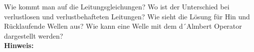 \begin{question}[section=5,subsection=53,name={Leitungsgleichungen},difficulty=7,type=mdl,tags={}]
	Wie kommt man auf die Leitungsgleichungen? Wo ist der Unterschied bei verlustlosen und verlustbehafteten Leitungen? Wie sieht die Lösung für Hin und Rücklaufende Wellen aus? Wie kann eine Welle mit dem d´Almbert Operator dargestellt werden?
	\\ \textbf{Hinweis:}\\
	
\end{question}
\begin{solution}
	
\end{solution}